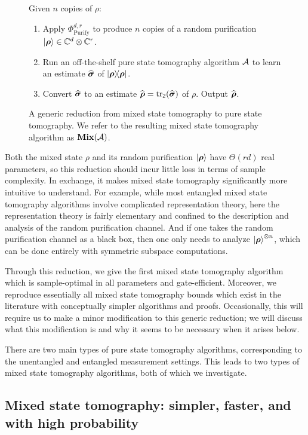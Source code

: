 \documentclass{article}
\newcommand{\mixed}{\textup{\textbf{Mix}}}
\newcommand{\purifychan}{\Phi_{\mathrm{Purify}}}
\newcommand{\reg}[1]{\mathsf{#1}}
\begin{document}
{
\begin{figure}[htbp]
Given $n$ copies of $\rho$:
\begin{enumerate}
    \item Apply $\purifychan^{d, r}$ to produce $n$ copies of a random purification $\ket{\boldsymbol{\rho}} \in \mathbb C^d \otimes \mathbb C^r$.
    \item Run an off-the-shelf pure state tomography algorithm $\mathcal{A}$ to learn an estimate $\widehat{\boldsymbol{\sigma}}$ of $\ketbra{\boldsymbol{\rho}}$.
    \item Convert $\widehat{\boldsymbol{\sigma}}$ to an estimate $\widehat{\brho} = \tr_{\reg{2}}(\widehat{\bsigma})$ of $\rho$. Output $\widehat{\boldsymbol{\rho}}$.
\end{enumerate}
\caption{A generic reduction from mixed state tomography to pure state tomography. We refer to the resulting mixed state tomography algorithm as $\mixed(\calA)$.}
\label{fig:reduction}
\end{figure}
}
\noindent
Both the mixed state $\rho$ and its random purification $\ket{\boldsymbol{\rho}}$ have $\Theta(rd)$ real parameters, so this reduction should incur little loss in terms of sample complexity.
In exchange, it makes mixed state tomography significantly more intuitive to understand.
For example, while most entangled mixed state tomography algorithms  involve complicated representation theory,
here the representation theory is fairly elementary and confined to the description and analysis of the random purification channel.
And if one takes the random purification channel as a black box, then one only needs to analyze  $\ket{\boldsymbol{\rho}}^{\otimes n}$, which can be done entirely with symmetric subspace computations.

Through this reduction, we give the first mixed state tomography algorithm which is sample-optimal in all parameters and gate-efficient.
Moreover, we reproduce essentially all mixed state tomography bounds which exist in the literature with conceptually simpler algorithms and proofs.
Occasionally, this will require us to make a minor modification to this generic reduction; we will discuss what this modification is and why it seems to be necessary when it arises below.

There are two main types of pure state tomography algorithms, corresponding to the unentangled and entangled measurement settings.
This leads to two types of mixed state tomography algorithms, both of which we investigate.



\subsection{Mixed state tomography: simpler, faster, and with high probability}
\label{sec:simpler}
\end{document}
